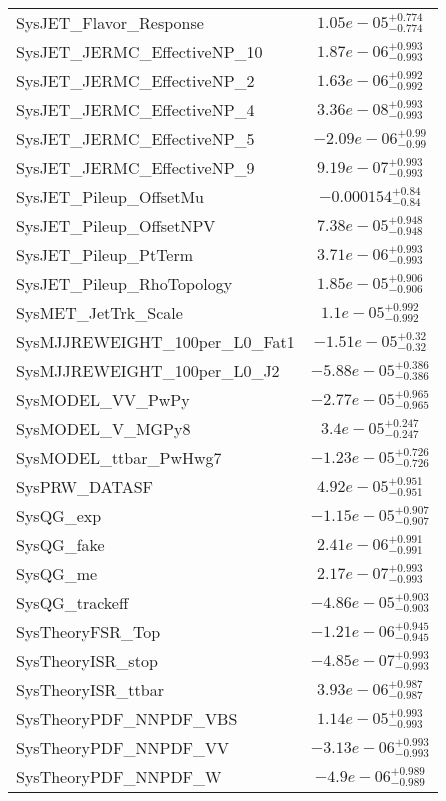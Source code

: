 \begin{tabular}{|l|c|}
SysJET\_Flavor\_Response & $1.05e-05^{+0.774}_{-0.774}$ \\
SysJET\_JERMC\_EffectiveNP\_10 & $1.87e-06^{+0.993}_{-0.993}$ \\
SysJET\_JERMC\_EffectiveNP\_2 & $1.63e-06^{+0.992}_{-0.992}$ \\
SysJET\_JERMC\_EffectiveNP\_4 & $3.36e-08^{+0.993}_{-0.993}$ \\
SysJET\_JERMC\_EffectiveNP\_5 & $-2.09e-06^{+0.99}_{-0.99}$ \\
SysJET\_JERMC\_EffectiveNP\_9 & $9.19e-07^{+0.993}_{-0.993}$ \\
SysJET\_Pileup\_OffsetMu & $-0.000154^{+0.84}_{-0.84}$ \\
SysJET\_Pileup\_OffsetNPV & $7.38e-05^{+0.948}_{-0.948}$ \\
SysJET\_Pileup\_PtTerm & $3.71e-06^{+0.993}_{-0.993}$ \\
SysJET\_Pileup\_RhoTopology & $1.85e-05^{+0.906}_{-0.906}$ \\
SysMET\_JetTrk\_Scale & $1.1e-05^{+0.992}_{-0.992}$ \\
SysMJJREWEIGHT\_100per\_L0\_Fat1 & $-1.51e-05^{+0.32}_{-0.32}$ \\
SysMJJREWEIGHT\_100per\_L0\_J2 & $-5.88e-05^{+0.386}_{-0.386}$ \\
SysMODEL\_VV\_PwPy & $-2.77e-05^{+0.965}_{-0.965}$ \\
SysMODEL\_V\_MGPy8 & $3.4e-05^{+0.247}_{-0.247}$ \\
SysMODEL\_ttbar\_PwHwg7 & $-1.23e-05^{+0.726}_{-0.726}$ \\
SysPRW\_DATASF & $4.92e-05^{+0.951}_{-0.951}$ \\
SysQG\_exp & $-1.15e-05^{+0.907}_{-0.907}$ \\
SysQG\_fake & $2.41e-06^{+0.991}_{-0.991}$ \\
SysQG\_me & $2.17e-07^{+0.993}_{-0.993}$ \\
SysQG\_trackeff & $-4.86e-05^{+0.903}_{-0.903}$ \\
SysTheoryFSR\_Top & $-1.21e-06^{+0.945}_{-0.945}$ \\
SysTheoryISR\_stop & $-4.85e-07^{+0.993}_{-0.993}$ \\
SysTheoryISR\_ttbar & $3.93e-06^{+0.987}_{-0.987}$ \\
SysTheoryPDF\_NNPDF\_VBS & $1.14e-05^{+0.993}_{-0.993}$ \\
SysTheoryPDF\_NNPDF\_VV & $-3.13e-06^{+0.993}_{-0.993}$ \\
SysTheoryPDF\_NNPDF\_W & $-4.9e-06^{+0.989}_{-0.989}$ \\

\end{tabular}
